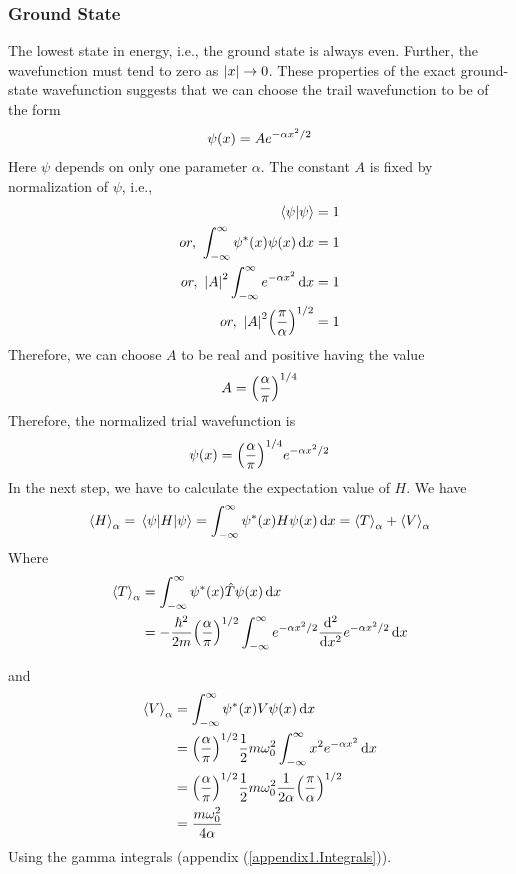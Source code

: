 	\subsubsection{Ground State}
	
	 The lowest state in energy, i.e., the ground state is always even. Further, the wavefunction must tend to zero as $\abs{x} \rightarrow 0 $. These properties of the exact ground-state wavefunction suggests that we can choose the trail wavefunction to be of the form
	\begin{equation*}
		\psi\qty(x) = A e ^{-\alpha x^2 / 2}
	\end{equation*}
	Here $\psi$ depends on only one parameter $\alpha$. The constant $A$ is fixed by normalization of $\psi$, i.e.,
	\begin{align*}
		\braket{\psi}{\psi} &= 1 \\
		or, \ \int_{-\infty}^{\infty} \psi^*\qty(x) \psi\qty(x) \dd{x} &= 1\\
		or, \ \abs{A}^2 \int_{-\infty}^{\infty} e^{-\alpha x^2} \dd{x} &= 1\\
		or, \ \abs{A}^2 \qty(\frac{\pi}{\alpha})^{1/2} &= 1
	\end{align*}
	Therefore, we can choose $A$ to be real and positive having the value
	\begin{align*}
		A = \qty(\frac{\alpha}{\pi})^{1/4}
	\end{align*}
	Therefore, the normalized trial wavefunction is 
	\begin{equation*}
		\psi\qty(x) = \qty(\frac{\alpha}{\pi})^{1/4} e^{-\alpha x^2 / 2}
	\end{equation*}
	In the next step, we have to calculate the expectation value of $H$. We have
	\begin{equation*}
		\expval{H}_\alpha = \expval{H}{\psi} = \int_{-\infty}^{\infty} \psi^* \qty(x) H \psi \qty(x) \dd{x} = \expval{T}_\alpha + \expval{V}_\alpha
	\end{equation*}
	Where
	\begin{align*}
		\expval{T}_\alpha 
		&= \int_{-\infty}^{\infty} \psi^* \qty(x) \hat{T} \psi \qty(x) \dd{x} \\
		&= -\frac{\hbar^2}{2 m} \qty(\frac{\alpha}{\pi})^{1/2} \int_{-\infty}^{\infty} e^{-\alpha x^2/2} \dv[2]{}{x} e^{-\alpha x^2 / 2} \dd{x}
	\end{align*}
	
	and
	\begin{align*}
	\expval{V}_\alpha 
	&= \int_{-\infty}^{\infty} \psi^* \qty(x) V \psi \qty(x) \dd{x} \\
	&= \qty(\frac{\alpha}{\pi})^{1/2} \frac{1}{2} m \omega_0^2 \int_{-\infty}^{\infty} x^2 e^{-\alpha x^2} \dd{x} \\
	&= \qty(\frac{\alpha}{\pi})^{1/2} \frac{1}{2} m \omega_0^2 \frac{1}{2 \alpha} \qty(\frac{\pi}{\alpha})^{1/2} \\
	&= \frac{m \omega_0^2}{4 \alpha}
	\end{align*}
	Using the gamma integrals (appendix (\ref{appendix1.Integrals})).\\
	
